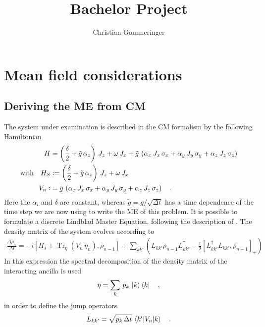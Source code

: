 \documentclass{article}
\title{Bachelor Project}
\author{Christian Gommeringer}
\begin{document}
\newcommand{\half}{\frac{1}{2}}
\newcommand{\Tr}{\operatorname{Tr}}
\newcommand{\Trs}[1]{\Tr_S\left\{#1\right\}}
\newcommand{\dt}{\frac{\text{d}}{\text{d}t}}
\maketitle
\section*{Mean field considerations}
\subsection*{Deriving the ME from CM}
The system under examination is described in the CM formalism by the following Hamiltonian
\begin{align}\label{eq:Ham}
    H&=\left(\frac{\delta}{2}+\tilde{g}\,\alpha_z\right)\,J_z+\omega\,J_x+\tilde{g}\,\left(\alpha_x\,J_x\,\sigma_x+\alpha_y\,J_y\,\sigma_y+\alpha_z\,J_z\,\sigma_z\right)\notag\\
    \text{with}\quad{H_S}&\vcentcolon=\left(\frac{\delta}{2}+\tilde{g}\,\alpha_z\right)\,J_z+\omega\,J_x\\
    V_n\vcentcolon&=\tilde{g}\,\left(\alpha_x\,J_x\,\sigma_x+\alpha_y\,J_y\,\sigma_y+\alpha_z\,J_z\,\sigma_z\right)\quad.\notag
\end{align}
Here the $\alpha_i$ and $\delta$ are constant, whereas $\tilde{g}=g/\sqrt{\Delta{t}}$ has a time dependence of the time step we are now using to write the ME of this problem.
It is possible to formulate a discrete Lindblad Master Equation, following the description of \cite{overview}. The density matrix of the system evolves according to
\begin{align}\label{eq:ME}
\frac{\Delta \rho_n}{\Delta t} = -i[H_s + \operatorname{Tr}_\eta(V_n\,\eta_n), \rho_{n-1}] + \sum_{kk'} \left( L_{kk'} \rho_{n-1} L_{kk'}^\dagger - \frac{1}{2} \left[L_{kk'}^\dagger L_{kk'}, \rho_{n-1} \right]_+\right)
\end{align}
In this expression the spectral decomposition of the density matrix of the interacting ancilla is used
\begin{equation*}
    \eta=\sum_k\,p_k\,\ket{k}\bra{k}\quad,
\end{equation*}
in order to define the jump operators
\begin{equation*}
    L_{kk'}=\sqrt{p_k\,\Delta{t}}\,\braket{k'|V_n|k}\quad.
\end{equation*}
\end{document}
